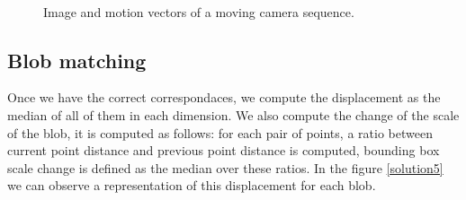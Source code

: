 \begin{figure}[H]
		
\centering

\\
\caption{Image and motion vectors of a moving camera sequence.}
\label{motion3}
\end{figure}


\subsection{Blob matching}


Once we have the correct correspondaces, we compute the displacement as the median of all of them in each dimension. We also compute the change of the scale of the blob, it is computed as follows: for each pair of points, a ratio between current point distance and previous point distance is computed, bounding box scale change is defined as the median over these ratios. In the figure \ref{solution5} we can observe a representation of this displacement for each blob.


